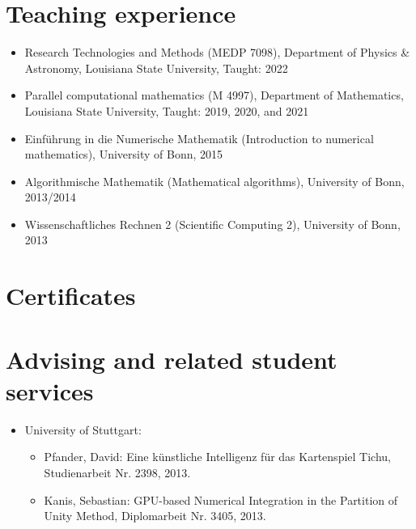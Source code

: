 \documentclass[11pt,a4paper,sans]{moderncv}
\begin{document}
\section{Teaching experience}
\begin{itemize}[leftmargin=4cm]
\item Research Technologies and Methods (MEDP 7098), Department of Physics \& Astronomy, Louisiana State University, Taught: 2022
\item Parallel computational mathematics (M 4997), Department of Mathematics,  Louisiana State University, Taught: 2019, 2020, and 2021
\end{itemize}

\begin{itemize}[leftmargin=4cm]
\item Einf\"uhrung in die Numerische Mathematik (Introduction to numerical mathematics), University of Bonn, 2015
\item Algorithmische Mathematik (Mathematical algorithms), University of Bonn, 2013/2014
\item Wissenschaftliches Rechnen 2 (Scientific Computing 2),  University of Bonn, 2013 
\end{itemize}


\section{Certificates}

\section{Advising and related student services}
\begin{itemize}[leftmargin=4cm]
\item University of Stuttgart:
\begin{itemize}
\item Pfander, David: Eine künstliche Intelligenz für das Kartenspiel Tichu, Studienarbeit Nr. 2398, 2013.
\item Kanis, Sebastian: GPU-based Numerical Integration in the Partition of Unity Method, Diplomarbeit Nr. 3405, 2013.
\end{itemize}
\end{itemize}
\end{document}
